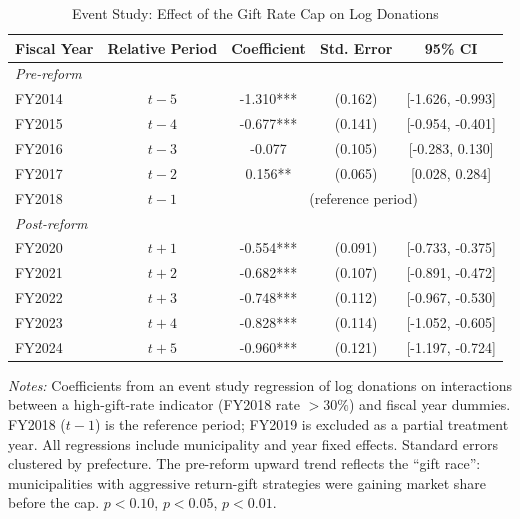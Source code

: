 \begin{table}[htbp]
\centering
\caption{Event Study: Effect of the Gift Rate Cap on Log Donations}
\label{tab:eventstudy}
\begin{tabular}{lcccc}
\hline\hline
Fiscal Year & Relative Period & Coefficient & Std. Error & 95\% CI \\
\hline
\multicolumn{5}{l}{\textit{Pre-reform}} \\
FY2014 & $t-5$ & -1.310*** & (0.162) & [-1.626, -0.993] \\
FY2015 & $t-4$ & -0.677*** & (0.141) & [-0.954, -0.401] \\
FY2016 & $t-3$ & -0.077 & (0.105) & [-0.283, 0.130] \\
FY2017 & $t-2$ & 0.156** & (0.065) & [0.028, 0.284] \\
FY2018 & $t-1$ & \multicolumn{3}{c}{(reference period)} \\
\hline
\multicolumn{5}{l}{\textit{Post-reform}} \\
FY2020 & $t+1$ & -0.554*** & (0.091) & [-0.733, -0.375] \\
FY2021 & $t+2$ & -0.682*** & (0.107) & [-0.891, -0.472] \\
FY2022 & $t+3$ & -0.748*** & (0.112) & [-0.967, -0.530] \\
FY2023 & $t+4$ & -0.828*** & (0.114) & [-1.052, -0.605] \\
FY2024 & $t+5$ & -0.960*** & (0.121) & [-1.197, -0.724] \\
\hline\hline
\end{tabular}
\begin{tablenotes}[flushleft]
\small
\item \textit{Notes:} Coefficients from an event study regression of log donations on interactions between a high-gift-rate indicator (FY2018 rate $> 30\%$) and fiscal year dummies. FY2018 ($t{-}1$) is the reference period; FY2019 is excluded as a partial treatment year. All regressions include municipality and year fixed effects. Standard errors clustered by prefecture. The pre-reform upward trend reflects the ``gift race'': municipalities with aggressive return-gift strategies were gaining market share before the cap. \sym{*} $p < 0.10$, \sym{**} $p < 0.05$, \sym{***} $p < 0.01$.
\end{tablenotes}
\end{table}


